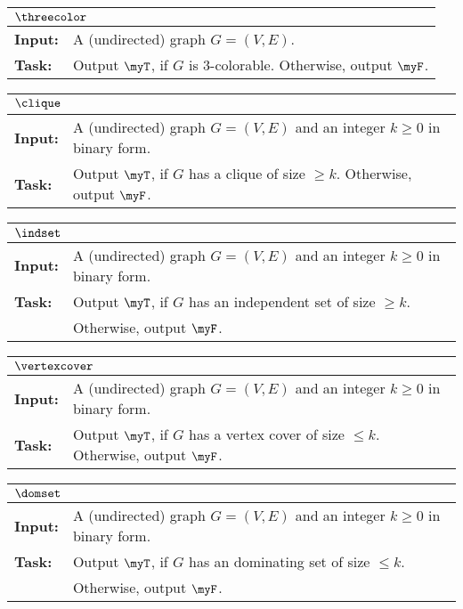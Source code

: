 \documentclass[11pt, a4paper]{article}
\begin{document}
\vspace{0.3cm}
\noindent
{\def\arraystretch{1.25}
\begin{tabular}{|ll|}
\hline
\multicolumn{2}{|l|}{$\threecolor$}
\\
\hline\hline
{\bf Input:}
&
A (undirected) graph $G=(V,E)$.
\\
{\bf Task:}
&
Output $\myT$, if $G$ is 3-colorable.
Otherwise, output $\myF$.
\\
\hline
\end{tabular}}

\vspace{0.6cm}
\noindent
{\def\arraystretch{1.25}
\begin{tabular}{|ll|}
\hline
\multicolumn{2}{|l|}{$\clique$}
\\
\hline\hline
{\bf Input:}
&
A (undirected) graph $G=(V,E)$ and an integer $k\geq 0$ in binary form.
\\
{\bf Task:}
&
Output $\myT$, if 
$G$ has a clique of size $\geq k$.
Otherwise, output $\myF$.
\\
\hline
\end{tabular}}


\vspace{0.6cm}
\noindent
{\def\arraystretch{1.25}
\begin{tabular}{|ll|}
\hline
\multicolumn{2}{|l|}{$\indset$}
\\
\hline\hline
{\bf Input:}
&
A (undirected) graph $G=(V,E)$ and an integer $k\geq 0$ in binary form.
\\
{\bf Task:}
&
Output $\myT$, if 
$G$ has an independent set of size $\geq k$.
\\
& Otherwise, output $\myF$.
\\
\hline
\end{tabular}}

\vspace{0.6cm}
\noindent
{\def\arraystretch{1.25}
\begin{tabular}{|ll|}
\hline
\multicolumn{2}{|l|}{$\vertexcover$}
\\
\hline\hline
{\bf Input:}
&
A (undirected) graph $G=(V,E)$ and an integer $k\geq 0$ in binary form.
\\
{\bf Task:}
&
Output $\myT$, if 
$G$ has a vertex cover of size $\leq k$.
Otherwise, output $\myF$.
\\
\hline
\end{tabular}}

\vspace{0.6cm}
\noindent
{\def\arraystretch{1.25}
\begin{tabular}{|ll|}
\hline
\multicolumn{2}{|l|}{$\domset$}
\\
\hline\hline
{\bf Input:}
&
A (undirected) graph $G=(V,E)$ and an integer $k\geq 0$ in binary form.
\\
{\bf Task:}
&
Output $\myT$, if 
$G$ has an dominating set of size $\leq k$.
\\
& Otherwise, output $\myF$.
\\
\hline
\end{tabular}}
\end{document}
